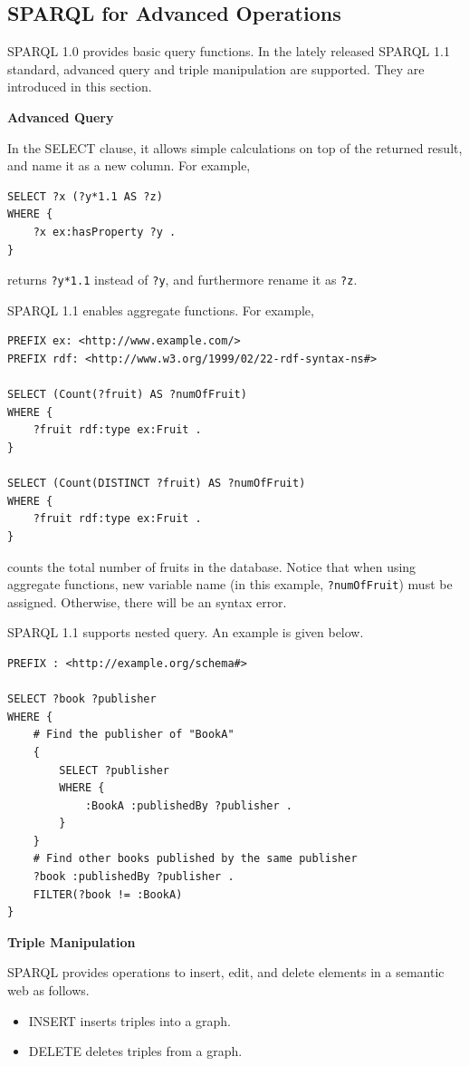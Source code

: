 \subsection{SPARQL for Advanced Operations}

SPARQL 1.0 provides basic query functions. In the lately released SPARQL 1.1 standard, advanced query and triple manipulation are supported. They are introduced in this section.

\vspace{0.1in}
\noindent \textbf{Advanced Query}
\vspace{0.1in}

In the SELECT clause, it allows simple calculations on top of the returned result, and name it as a new column. For example,
\begin{lstlisting}
SELECT ?x (?y*1.1 AS ?z)
WHERE {
	?x ex:hasProperty ?y .
}
\end{lstlisting}
returns \verb|?y*1.1| instead of \verb|?y|, and furthermore rename it as \verb|?z|.

SPARQL 1.1 enables aggregate functions. For example,
\begin{lstlisting}
PREFIX ex: <http://www.example.com/>
PREFIX rdf: <http://www.w3.org/1999/02/22-rdf-syntax-ns#>

SELECT (Count(?fruit) AS ?numOfFruit)
WHERE {
	?fruit rdf:type ex:Fruit .
}

SELECT (Count(DISTINCT ?fruit) AS ?numOfFruit)
WHERE {
	?fruit rdf:type ex:Fruit .
}
\end{lstlisting}
counts the total number of fruits in the database. Notice that when using aggregate functions, new variable name (in this example, \verb|?numOfFruit|) must be assigned. Otherwise, there will be an syntax error.

SPARQL 1.1 supports nested query. An example is given below.
\begin{lstlisting}
PREFIX : <http://example.org/schema#>

SELECT ?book ?publisher
WHERE {
	# Find the publisher of "BookA"
	{
		SELECT ?publisher
		WHERE {
			:BookA :publishedBy ?publisher .
		}
	}
	# Find other books published by the same publisher
	?book :publishedBy ?publisher .
	FILTER(?book != :BookA)
}
\end{lstlisting}

\vspace{0.1in}
\noindent \textbf{Triple Manipulation}
\vspace{0.1in}

SPARQL provides operations to insert, edit, and delete elements in a semantic web as follows.
\begin{itemize}
	\item INSERT inserts triples into a graph.
	\item DELETE deletes triples from a graph.
\end{itemize}


